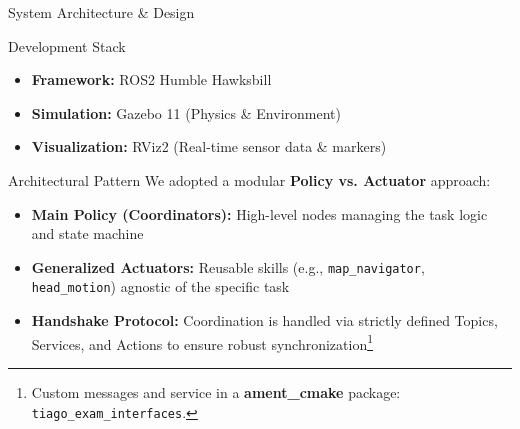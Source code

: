 \begin{frame}{System Architecture \& Design}

    \begin{block}{Development Stack}
        \begin{itemize}
            \item \textbf{Framework:} ROS2 Humble Hawksbill
            \item \textbf{Simulation:} Gazebo 11 (Physics \& Environment)
            \item \textbf{Visualization:} RViz2 (Real-time sensor data \& markers)
        \end{itemize}
    \end{block}

    \begin{block}{Architectural Pattern}
        We adopted a modular \textbf{Policy vs. Actuator} approach:
        \begin{itemize}
            \item \textbf{Main Policy (Coordinators):} High-level nodes managing the task logic and state machine
            \item \textbf{Generalized Actuators:} Reusable skills (e.g., \texttt{map\_navigator}, \texttt{head\_motion}) agnostic of the specific task
            \item \textbf{Handshake Protocol:} Coordination is handled via strictly defined Topics, Services, and Actions to ensure robust synchronization\footnote{Custom messages and service in a \textbf{ament\_cmake} package: \texttt{tiago\_exam\_interfaces}.}
        \end{itemize}
    \end{block}

\end{frame}

    

